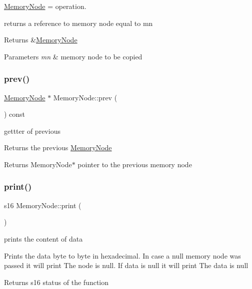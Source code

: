 \hyperlink{class_memory_node}{Memory\+Node} = operation. 

returns a reference to memory node equal to mn

\begin{DoxyReturn}{Returns}
\&\hyperlink{class_memory_node}{Memory\+Node} 
\end{DoxyReturn}

\begin{DoxyParams}{Parameters}
{\em mn} & memory node to be copied \\
\hline
\end{DoxyParams}
\mbox{\label{class_memory_node_a4fe6fb65838319101cde35a371728bb5}} 
\subsubsection{\texorpdfstring{prev()}{prev()}}
{\footnotesize\ttfamily \hyperlink{class_memory_node}{Memory\+Node} $\ast$ Memory\+Node\+::prev (\begin{DoxyParamCaption}{ }\end{DoxyParamCaption}) const}



gettter of previous 

Returns the previous \hyperlink{class_memory_node}{Memory\+Node}

\begin{DoxyReturn}{Returns}
Memory\+Node$\ast$ pointer to the previous memory node 
\end{DoxyReturn}
\mbox{\label{class_memory_node_a97e6335a0d16bf6550b036d7a96c0f58}} 
\subsubsection{\texorpdfstring{print()}{print()}}
{\footnotesize\ttfamily s16 Memory\+Node\+::print (\begin{DoxyParamCaption}{ }\end{DoxyParamCaption})}



prints the content of data 

Prints the data byte to byte in hexadecimal. In case a null memory node was passed it will print The node is null. If data is null it will print The data is null \begin{DoxyReturn}{Returns}
s16 status of the function 
\end{DoxyReturn}
\mbox{\label{class_memory_node_a705f9683b7f721e3fbc90b82bb1daacc}} 
